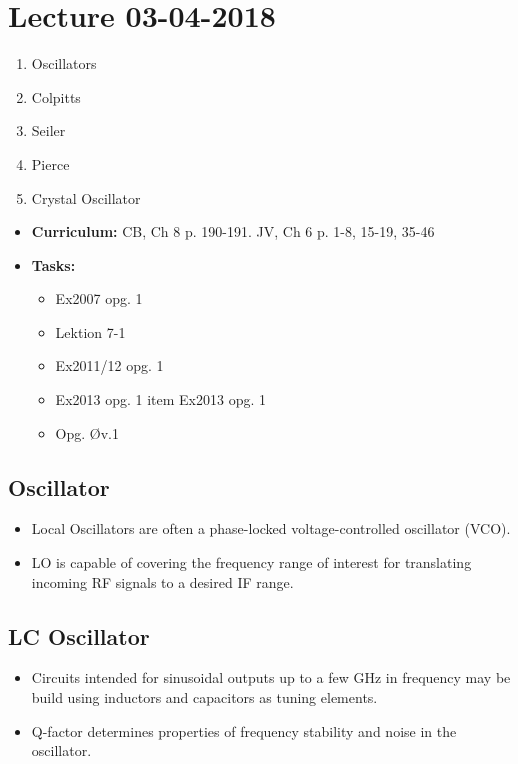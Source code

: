 \section{Lecture 03-04-2018}

\begin{enumerate}
	\item Oscillators
	\item Colpitts
	\item Seiler
	\item Pierce
	\item Crystal Oscillator
\end{enumerate}

\begin{mdframed}[style=exampledefault]
	\begin{itemize}
		\item \textbf{Curriculum:} CB, Ch 8 p. 190-191. JV, Ch 6 p. 1-8, 15-19, 35-46
		\item \textbf{Tasks:} 
		\begin{itemize}
			\item Ex2007 opg. 1
			\item Lektion 7-1
			\item Ex2011/12 opg. 1
			\item Ex2013 opg. 1
			item Ex2013 opg. 1
			\item Opg. Øv.1
		\end{itemize}
	\end{itemize}
\end{mdframed}

\subsection{Oscillator}
\begin{itemize}
	\item Local Oscillators are often a phase-locked voltage-controlled oscillator (VCO).
	\item LO is capable of covering the frequency range of interest for
	translating incoming RF signals to a desired IF range.
\end{itemize}

\subsection{LC Oscillator}
\begin{itemize}
	\item Circuits intended for sinusoidal outputs up to a few \si{\giga\hertz} in frequency may be build using inductors and capacitors as tuning elements.
	\item Q-factor determines properties of frequency stability and noise in the oscillator.
\end{itemize}

